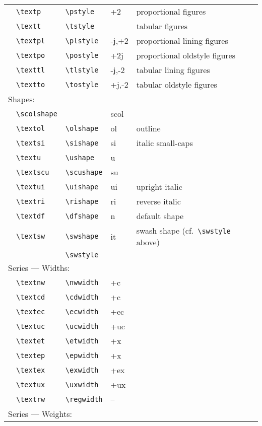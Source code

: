 \documentclass[pagesize=auto, fontsize=10pt, DIV=11]{scrartcl}
\newcommand*{\cs}[1]{\texttt{\textbackslash #1}}
\begin{document}
\begin{longtable}{lll>{\ttfamily}ll}
  & \cs{textp} & \cs{pstyle} & +2 &  proportional figures\\
  & \cs{textt} & \cs{tstyle} & -2 &   tabular figures\\
  & \cs{textpl} & \cs{plstyle} & -j,+2 & proportional lining figures \\
  & \cs{textpo} & \cs{postyle} & +2j & proportional oldstyle figures \\
  & \cs{texttl} & \cs{tlstyle} & -j,-2 & tabular lining figures\\
  & \cs{textto} & \cs{tostyle} & +j,-2 & tabular oldstyle figures\\
  \cmidrule(lr){1-5}
  \multicolumn{5}{l}{\sffamily Shapes:}\\
  \cmidrule(lr){1-5}
  & \cs{scolshape} & & scol & \\
  & \cs{textol} & \cs{olshape} & ol & outline\\
  & \cs{textsi} & \cs{sishape} & si & italic small-caps\\
  & \cs{textu} & \cs{ushape} & u & \\
  & \cs{textscu} & \cs{scushape} & su & \\
  & \cs{textui} & \cs{uishape} & ui & upright italic\\
  & \cs{textri} & \cs{rishape} & ri & reverse italic\\
  & \cs{textdf} & \cs{dfshape} & n & default shape\\
  & \cs{textsw} & \cs{swshape} & it & swash shape (cf.~\cs{swstyle} above)\\
  & & \cs{swstyle} &  \\
  \cmidrule(lr){1-5}
  \multicolumn{5}{l}{\sffamily Series --- Widths:}\\
  \cmidrule(lr){1-5}
  & \cs{textnw} & \cs{nwwidth} & +c & \\
  & \cs{textcd} & \cs{cdwidth} & +c & \\
  & \cs{textec} & \cs{ecwidth} & +ec & \\
  & \cs{textuc} & \cs{ucwidth} & +uc & \\
  & \cs{textet} & \cs{etwidth} & +x & \\
  & \cs{textep} & \cs{epwidth} & +x & \\
  & \cs{textex} & \cs{exwidth} & +ex & \\
  & \cs{textux} & \cs{uxwidth} & +ux & \\
  & \cs{textrw} & \cs{regwidth} & -- & \\
  \cmidrule(lr){1-5}
  \multicolumn{5}{l}{\sffamily Series --- Weights:}\\

\end{longtable}
\end{document}
